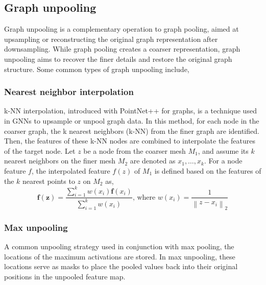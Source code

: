 \subsection{Graph unpooling}
Graph unpooling is a complementary operation to graph pooling, aimed at upsampling or reconstructing the original graph representation after downsampling. While graph pooling creates a coarser representation, graph unpooling aims to recover the finer details and restore the original graph structure. Some common types of graph unpooling include,
\subsubsection{Nearest neighbor interpolation} 
k-NN interpolation, introduced with PointNet++ \cite{pnpp} for graphs, is a technique used in GNNs to upsample or unpool graph data. In this method, for each node in the coarser graph, the k nearest neighbors (k-NN) from the finer graph are identified. Then, the features of these k-NN nodes are combined to interpolate the features of the target node. Let \(z\) be a node from the coarser mesh \(M_1\), and assume its \(k\) nearest neighbors on the finer mesh \(M_2\) are denoted as \(x_1, \ldots, x_k\). For a node feature \(f\), the interpolated feature \(f(z)\) of \(M_1\) is defined based on the features of the $k$ nearest points to $z$ on \(M_2\) as,
\begin{equation}
  \mathbf{f}(\mathbf{z})=\frac{\sum_{i=1}^k w\left(x_i\right) \mathbf{f}\left(x_i\right)}{\sum_{i=1}^k w\left(x_i\right)} \text {, where } w\left(x_i\right)=\frac{1}{\left\|z-x_i\right\|_2}
  \end{equation}
\subsubsection{Max unpooling} A common unpooling strategy used in conjunction with max pooling, the locations of the maximum activations are stored. In max unpooling, these locations serve as masks to place the pooled values back into their original positions in the unpooled feature map.
